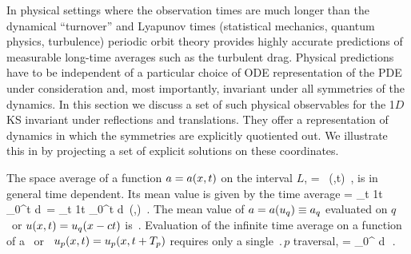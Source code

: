 


In physical settings where the observation times are much longer
than the dynamical ``turnover'' and Lyapunov times (statistical mechanics,
quantum physics, turbulence) 
periodic orbit theory
provides highly accurate predictions of measurable
long-time averages such as the turbulent drag.
Physical predictions have to be independent of a
particular choice of ODE representation of 
the PDE under consideration
and, most importantly, 
invariant under all symmetries of the dynamics.
In this section we discuss
a set of such physical observables for
the  1$D$ KS invariant under reflections and translations.
They offer a representation of
dynamics in which the symmetries are explicitly quotiented out.
We illustrate  this in   by projecting 
a set of explicit solutions on these coordinates. 

The {space average} of a function $a = a(x,t)$  on
the interval $L$,
\beq
    \expct{\obser} = \Lint{\pSpace}\, \obser(\pSpace,t)
    \,,
    \label{rpo:spac_ave}
\eeq
is in general time dependent. 
Its mean value is given by the {time average}
\beq
\timeAver{\obser}
    =
\lim_{t\rightarrow \infty} {1\over t} \int_0^t \! d\tau \, \expct{\obser}
    =
\lim_{t\rightarrow \infty} {1\over t} \int_0^t \! 
    \Lint{\tau}  d\pSpace\, \obser(\pSpace,\tau)
    \,.
\label{rpo:tim_ave}
\eeq
The mean value
of $a = a(u_q) \equiv a_q$ evaluated on
$q$ \eqv\ or {\reqv} $u(x,t) = u_q(x-ct)$ is
\beq
\,.
\label{rpo:u-eqv}
\eeq
Evaluation of the infinite time average 
on a function of a 
\po\ or \rpo\ $u_p(x,t)=u_p(x,t+{T_{p}})$
 requires only a single $\period{p}$ 
traversal, 
\beq
        = 
    \int_0^{} \! d\tau \, \expct{\obser}
\,.
\label{rpo:u-cyc}
\eeq

